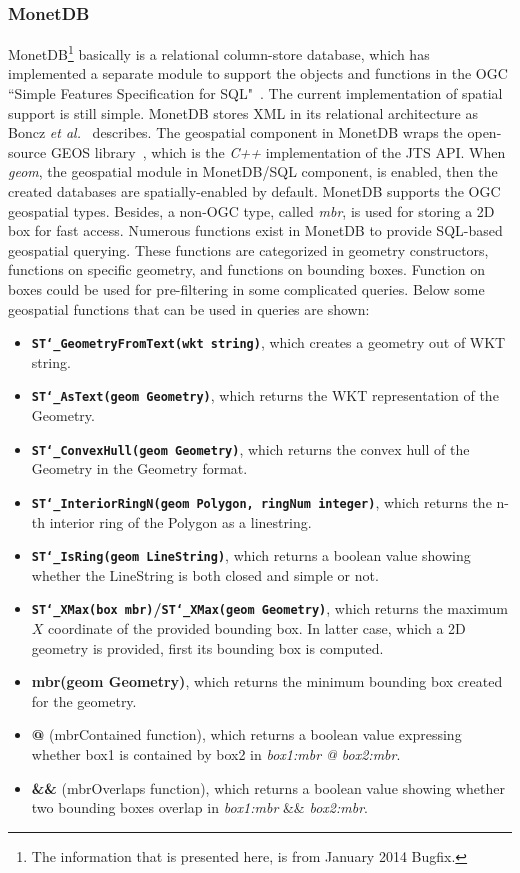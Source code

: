 \documentclass[a4paper,12pt]{article}
\begin{document}
\subsubsection{MonetDB}
MonetDB\footnote{The information that is presented here, is from January 2014 Bugfix.} basically is a relational column-store database, which has implemented a separate module to support the objects and functions in the OGC ``Simple Features Specification for SQL"~\cite{ogcsfs}. The current implementation of spatial support is still simple. MonetDB stores XML in its relational architecture as Boncz \emph{et al.}~\cite{Boncz2006} describes. The geospatial component in MonetDB wraps the open-source GEOS library~\cite{GEOS},
which is the \textit{C++} implementation of the JTS API. When \textit{geom}, the geospatial module in MonetDB/SQL component, is enabled, then the created databases are spatially-enabled by default. MonetDB supports the OGC geo\-spatial types. Besides, a non-OGC type, called \textit{mbr}, is used for storing a 2D box for fast access. Numerous functions exist in MonetDB to provide SQL-based geospatial querying. These functions are categorized in geometry constructors, functions on specific geometry, and functions on bounding boxes. Function on boxes could be used for pre-filtering in some complicated queries. Below some geospatial functions that can be used in queries are shown:
\begin{itemize}
\item \textbf{\texttt{ST\char`_GeometryFromText(wkt string)}}, which creates a geometry out of WKT string.
\item \textbf{\texttt{ST\char`_AsText(geom Geometry)}}, which returns the WKT representation of the Geometry.
\item \textbf{\texttt{ST\char`_ConvexHull(geom Geometry)}}, which returns the convex hull of the Geo\-metry in the Geometry format.
\item \textbf{\texttt{ST\char`_InteriorRingN(geom Polygon, ringNum integer)}}, which returns the n-th interior ring of the Polygon as a linestring.
\item \textbf{\texttt{ST\char`_IsRing(geom LineString)}}, which returns a boolean value showing whether the LineString is both closed and simple or not.
\item \textbf{\texttt{ST\char`_XMax(box mbr)}/\texttt{ST\char`_XMax(geom Geometry)}}, which returns the maximum $X$ coordinate of the provided bounding box. In latter case, which a 2D geo\-metry is provided, first its bounding box is computed.
\item \textbf{mbr(geom Geometry)}, which returns the minimum bounding box created for the geometry.
\item \textbf{@} (mbrContained function), which returns a boolean value expressing whether box1 is contained by box2 in \textit{box1:mbr @ box2:mbr}.
\item \textbf{\&\&} (mbrOverlaps function), which returns a boolean value showing whether two bounding boxes overlap in \textit{box1:mbr} \&\& \textit{box2:mbr}.

\end{itemize}
\end{document}

